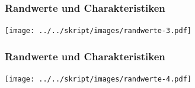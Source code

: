 \documentclass{beamer}
\begin{document}
\begin{frame}
\frametitle{Randwerte und Charakteristiken}
\begin{center}
\texttt{[image: ../../skript/images/randwerte-3.pdf]}
\end{center}
\end{frame}

\begin{frame}
\frametitle{Randwerte und Charakteristiken}
\begin{center}
\texttt{[image: ../../skript/images/randwerte-4.pdf]}
\end{center}
\end{frame}
\end{document}
